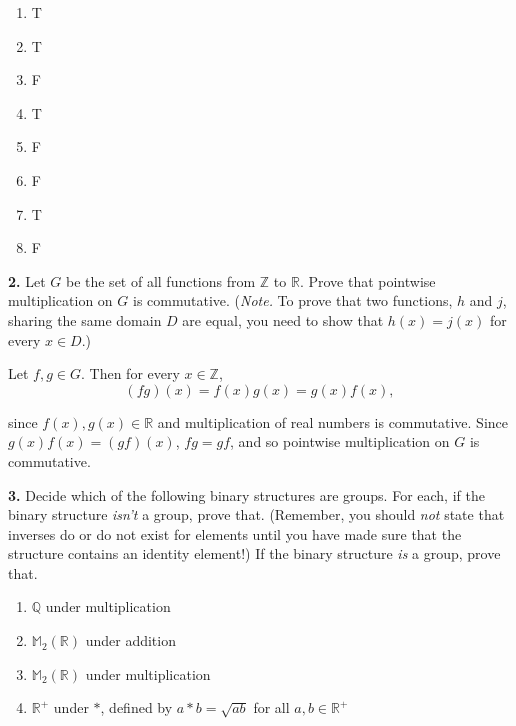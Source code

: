 \documentclass[10pt,]{book}
\theoremstyle{plain}
\theoremstyle{definition}
\theoremstyle{definition}
\theoremstyle{definition}
\theoremstyle{definition}
\numberwithin{equation}{section}
\def\Z{\mathbb{Z}}
\def\R{\mathbb{R}}
\def\Q{\mathbb{Q}}
\def\M{\mathbb{M}}
\begin{document}
\par\smallskip
\leavevmode%
\begin{multicols}{4}
\begin{enumerate}[label=(\alph*)]
\item\hypertarget{li-103}{}
          T
\item\hypertarget{li-104}{}
          T
\item\hypertarget{li-105}{}
          F
\item\hypertarget{li-106}{}
          T
\item\hypertarget{li-107}{}
          F
\item\hypertarget{li-108}{}
          F
\item\hypertarget{li-109}{}
          T
\item\hypertarget{li-110}{}
          F
\end{enumerate}
\end{multicols}
\par\smallskip
\noindent\textbf{2.}\quad{}
        Let \(G\) be the set of all functions from \(\Z\) to \(\R\). Prove that pointwise multiplication on \(G\) is commutative. (\emph{Note.} To prove that two functions, \(h\) and \(j\), sharing the same domain \(D\) are equal, you need to show that \(h(x)=j(x)\) for every \(x\in D\).)
\par\smallskip

      Let \(f,g\in G\). Then for every \(x\in \Z\),
\begin{equation*}

        (fg)(x)=f(x)g(x)=g(x)f(x),
      
\end{equation*}

      since \(f(x), g(x)\in \R\) and multiplication of real numbers is commutative. Since \(g(x)f(x)=(gf)(x)\),
      \(fg=gf\), and so pointwise multiplication on \(G\) is commutative.
\par\smallskip
\noindent\textbf{3.}\quad{}
        Decide which of the following binary structures are groups. For each, if the binary structure \emph{isn't} a group, prove that. (Remember, you should \emph{not} state that inverses do or do not exist for elements until you have made sure that the structure contains an identity element!) If the binary structure \emph{is} a group, prove that.
        \leavevmode%
\begin{enumerate}[label=(\alph*)]
\item\hypertarget{li-111}{}
              \(\Q\) under multiplication
\item\hypertarget{li-112}{}
              \(\M_2(\R)\) under addition
\item\hypertarget{li-113}{}
              \(\M_2(\R)\) under multiplication
\item\hypertarget{li-114}{}
              \(\R^+\) under \(*\), defined by \(a*b=\sqrt{ab}\) for all \(a,b\in \R^+\)
\end{enumerate}
\end{document}
